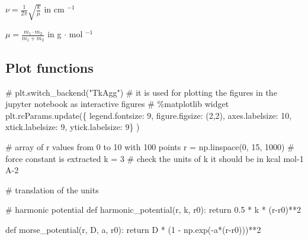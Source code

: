 \documentclass[
  letterpaper,
]{article}
\newenvironment{Shaded}{\begin{snugshade}}{\end{snugshade}}
\newcommand{\CommentTok}[1]{\textcolor[rgb]{0.37,0.37,0.37}{#1}}
\newcommand{\ControlFlowTok}[1]{\textcolor[rgb]{0.00,0.23,0.31}{#1}}
\newcommand{\DecValTok}[1]{\textcolor[rgb]{0.68,0.00,0.00}{#1}}
\newcommand{\FloatTok}[1]{\textcolor[rgb]{0.68,0.00,0.00}{#1}}
\newcommand{\KeywordTok}[1]{\textcolor[rgb]{0.00,0.23,0.31}{#1}}
\newcommand{\NormalTok}[1]{\textcolor[rgb]{0.00,0.23,0.31}{#1}}
\newcommand{\OperatorTok}[1]{\textcolor[rgb]{0.37,0.37,0.37}{#1}}
\newcommand{\StringTok}[1]{\textcolor[rgb]{0.13,0.47,0.30}{#1}}
\begin{document}
$\nu = \frac{1}{2\pi}\sqrt{\frac{k}{\mu}}$ in cm $^{-1}$

$\mu = \frac{m_1 \cdot m_2}{m_1 + m_2}$ in g $\cdot$ mol $^{-1}$

\hypertarget{plot-functions}{%
\subsection*{Plot functions}\label{plot-functions}}


\begin{Shaded}
\begin{Highlighting}[]
\CommentTok{\# plt.switch\_backend("TkAgg") }
\CommentTok{\# it is used for plotting the figures in the jupyter notebook as interactive figures}
\CommentTok{\# \%matplotlib widget}
\NormalTok{plt.rcParams.update(\{}
    \StringTok{\textquotesingle{}legend.fontsize\textquotesingle{}}\NormalTok{: }\DecValTok{9}\NormalTok{,}
    \StringTok{\textquotesingle{}figure.figsize\textquotesingle{}}\NormalTok{: (}\DecValTok{2}\NormalTok{,}\DecValTok{2}\NormalTok{),}
    \StringTok{\textquotesingle{}axes.labelsize\textquotesingle{}}\NormalTok{: }\DecValTok{10}\NormalTok{,}
    \StringTok{\textquotesingle{}xtick.labelsize\textquotesingle{}}\NormalTok{: }\DecValTok{9}\NormalTok{,}
    \StringTok{\textquotesingle{}ytick.labelsize\textquotesingle{}}\NormalTok{: }\DecValTok{9}\NormalTok{\}}
\NormalTok{)}

\CommentTok{\# array of r values from 0 to 10 with 100 points}
\NormalTok{r }\OperatorTok{=}\NormalTok{ np.linspace(}\DecValTok{0}\NormalTok{, }\DecValTok{15}\NormalTok{, }\DecValTok{1000}\NormalTok{)}
\CommentTok{\# force constant is extracted}
\NormalTok{k }\OperatorTok{=} \DecValTok{3} \CommentTok{\# check the units of k it should be in kcal mol{-}1 A{-}2}

\CommentTok{\# translation of the units}



\CommentTok{\# harmonic potential}
\KeywordTok{def}\NormalTok{ harmonic\_potential(r, k, r0):}
    \ControlFlowTok{return} \FloatTok{0.5} \OperatorTok{*}\NormalTok{ k }\OperatorTok{*}\NormalTok{ (r}\OperatorTok{{-}}\NormalTok{r0)}\OperatorTok{**}\DecValTok{2}

\KeywordTok{def}\NormalTok{ morse\_potential(r, D, a, r0):}
    \ControlFlowTok{return}\NormalTok{ D }\OperatorTok{*}\NormalTok{ (}\DecValTok{1} \OperatorTok{{-}}\NormalTok{ np.exp(}\OperatorTok{{-}}\NormalTok{a}\OperatorTok{*}\NormalTok{(r}\OperatorTok{{-}}\NormalTok{r0)))}\OperatorTok{**}\DecValTok{2}






\end{Highlighting}
\end{Shaded}
\end{document}
